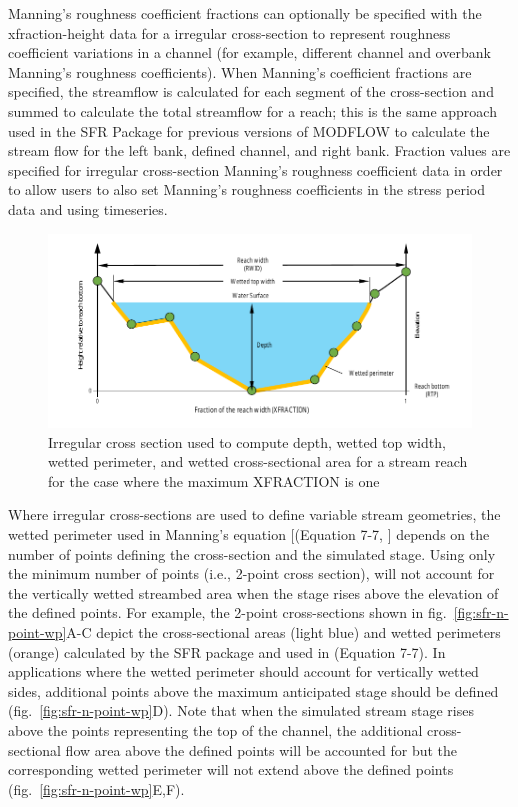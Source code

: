 Manning's roughness coefficient fractions can optionally be specified with the xfraction-height data for a irregular cross-section to represent roughness coefficient variations in a channel (for example, different channel and overbank Manning's roughness coefficients). When Manning's coefficient fractions are specified, the streamflow is calculated for each segment of the cross-section and summed to calculate the total streamflow for a reach; this is the same approach used in the SFR Package for previous versions of MODFLOW \citep{modflowsfr1pack} to calculate the stream flow for the left bank, defined channel, and right bank. Fraction values are specified for irregular cross-section Manning's roughness coefficient data in order to allow users to also set Manning's roughness coefficients in the stress period data and using timeseries.


\begin{figure}[ht]
	\centering
	\includegraphics[scale=1.0]{../Figures/n-point-cross-section}
	\caption[Illustration of a irregular cross section used to compute depth, wetted top width, wetted perimeter, and wetted cross-sectional area for a stream reach]{Irregular cross section used to compute depth, wetted top width, wetted perimeter, and wetted cross-sectional area for a stream reach for the case where the maximum XFRACTION is one}
	\label{fig:sfr-n-point}
\end{figure}

Where irregular cross-sections are used to define variable stream geometries, the wetted perimeter used in Manning’s equation [(Equation 7-7, \cite{modflow6gwf}] depends on the number of points defining the cross-section and the simulated stage.  Using only the minimum number of points (i.e., 2-point cross section), \mf will not account for the vertically wetted streambed area when the stage rises above the elevation of the defined points. For example, the 2-point cross-sections shown in fig.~\ref{fig:sfr-n-point-wp}A-C depict the cross-sectional areas (light blue) and wetted perimeters (orange) calculated by the SFR package and used in \cite{modflow6gwf} (Equation 7-7).  In applications where the wetted perimeter should account for vertically wetted sides, additional points above the maximum anticipated stage should be defined (fig.~\ref{fig:sfr-n-point-wp}D).  Note that when the simulated stream stage rises above the points representing the top of the channel, the additional cross-sectional flow area above the defined points will be accounted for but the corresponding wetted perimeter will not extend above the defined points (fig.~\ref{fig:sfr-n-point-wp}E,F).


